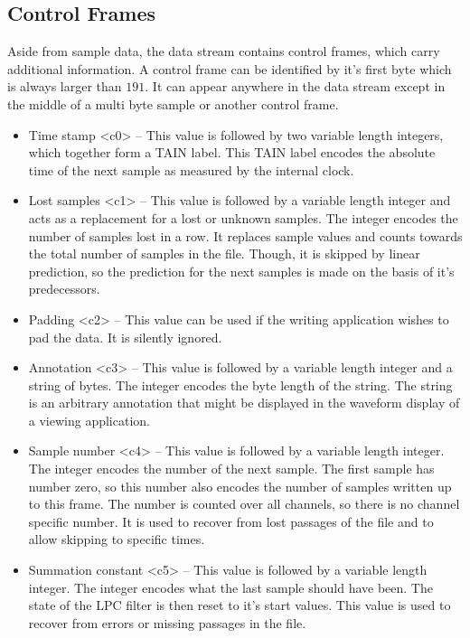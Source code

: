 \documentclass[DIV=10]{scrartcl}
\begin{document}
\subsection{Control Frames}
\label{controlframes}

Aside from sample data, the data stream contains control frames, which carry additional information.
A control frame can be identified by it’s first byte which is always larger than \(191\).
It can appear anywhere in the data stream except in the middle of a multi byte sample or another control frame.

\begin{itemize}
  \item Time stamp <c0> – This value is followed by two variable length integers, which together form a TAIN label.
  This TAIN label encodes the absolute time of the next sample as measured by the internal clock.
  \item Lost samples <c1> – This value is followed by a variable length integer and acts as a replacement for a lost or unknown samples.
  The integer encodes the number of samples lost in a row.
  It replaces sample values and counts towards the total number of samples in the file.
  Though, it is skipped by linear prediction, so the prediction for the next samples is made on the basis of it’s predecessors.
  \item Padding <c2> – This value can be used if the writing application wishes to pad the data.
  It is silently ignored.
  \item Annotation <c3> – This value is followed by a variable length integer and a string of bytes.
  The integer encodes the byte length of the string.
  The string is an arbitrary annotation that might be displayed in the waveform display of a viewing application.
  \item Sample number <c4> – This value is followed by a variable length integer.
  The integer encodes the number of the next sample.
  The first sample has number zero, so this number also encodes the number of samples written up to this frame.
  The number is counted over all channels, so there is no channel specific number.
  It is used to recover from lost passages of the file and to allow skipping to specific times.
  \item Summation constant <c5> – This value is followed by a variable length integer.
  The integer encodes what the last sample should have been.
  The state of the LPC filter is then reset to it’s start values.
  This value is used to recover from errors or missing passages in the file.

\end{itemize}
\end{document}
